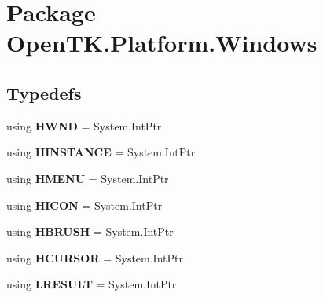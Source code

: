 \hypertarget{namespace_open_t_k_1_1_platform_1_1_windows}{\section{Package Open\-T\-K.\-Platform.\-Windows}
\label{namespace_open_t_k_1_1_platform_1_1_windows}
}
\subsection*{Typedefs}
\begin{DoxyCompactItemize}
\item 
\hypertarget{namespace_open_t_k_1_1_platform_1_1_windows_a1852bf9f3fc1b6566a8cbdbf468da511}{using {\bfseries H\-W\-N\-D} = System.\-Int\-Ptr}\label{namespace_open_t_k_1_1_platform_1_1_windows_a1852bf9f3fc1b6566a8cbdbf468da511}

\item 
\hypertarget{namespace_open_t_k_1_1_platform_1_1_windows_ae39173464b0e30dab7582568c8721e78}{using {\bfseries H\-I\-N\-S\-T\-A\-N\-C\-E} = System.\-Int\-Ptr}\label{namespace_open_t_k_1_1_platform_1_1_windows_ae39173464b0e30dab7582568c8721e78}

\item 
\hypertarget{namespace_open_t_k_1_1_platform_1_1_windows_a6c4da115da43ea763e2cb0a3bebd9d5d}{using {\bfseries H\-M\-E\-N\-U} = System.\-Int\-Ptr}\label{namespace_open_t_k_1_1_platform_1_1_windows_a6c4da115da43ea763e2cb0a3bebd9d5d}

\item 
\hypertarget{namespace_open_t_k_1_1_platform_1_1_windows_acc3b0c15f6b92242819266b63fd4b4f3}{using {\bfseries H\-I\-C\-O\-N} = System.\-Int\-Ptr}\label{namespace_open_t_k_1_1_platform_1_1_windows_acc3b0c15f6b92242819266b63fd4b4f3}

\item 
\hypertarget{namespace_open_t_k_1_1_platform_1_1_windows_a9a50b13073381cb80e9be48220ed243e}{using {\bfseries H\-B\-R\-U\-S\-H} = System.\-Int\-Ptr}\label{namespace_open_t_k_1_1_platform_1_1_windows_a9a50b13073381cb80e9be48220ed243e}

\item 
\hypertarget{namespace_open_t_k_1_1_platform_1_1_windows_affe01784a08a7251c17b2f9b39a9ae2d}{using {\bfseries H\-C\-U\-R\-S\-O\-R} = System.\-Int\-Ptr}\label{namespace_open_t_k_1_1_platform_1_1_windows_affe01784a08a7251c17b2f9b39a9ae2d}

\item 
\hypertarget{namespace_open_t_k_1_1_platform_1_1_windows_a97f0a0402d0b300dc3b4667f5d16c42b}{using {\bfseries L\-R\-E\-S\-U\-L\-T} = System.\-Int\-Ptr}\label{namespace_open_t_k_1_1_platform_1_1_windows_a97f0a0402d0b300dc3b4667f5d16c42b}


\end{DoxyCompactItemize}
